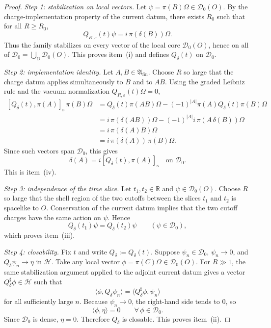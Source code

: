 \begin{proof}
\smallskip\noindent\textit{Step 1: stabilization on local vectors.}
Let \(\psi=\pi(B)\Omega\in\mathcal D_0(O)\). By the charge-implementation property of
the current datum, there exists \(R_0\) such that for all \(R\ge R_0\),
\[
Q_{R,\varepsilon}(t)\psi=i\,\pi(\delta(B))\Omega.
\]
Thus the family stabilizes on every vector of the local core \(\mathcal D_0(O)\), hence
on all of \(\mathcal D_0=\bigcup_O\mathcal D_0(O)\).
This proves item~\textnormal{(i)} and defines \(Q_\delta(t)\) on \(\mathcal D_0\).

\smallskip\noindent\textit{Step 2: implementation identity.}
Let \(A,B\in\mathfrak A_{\mathrm{fin}}\). Choose \(R\) so large that the charge datum
applies simultaneously to \(B\) and to \(AB\). Using the graded Leibniz rule and the
vacuum normalization \(Q_{R,\varepsilon}(t)\Omega=0\),
\[
\begin{aligned}
[Q_\delta(t),\pi(A)]_{\mathrm s}\,\pi(B)\Omega
&=
Q_\delta(t)\pi(AB)\Omega-(-1)^{|A|}\pi(A)Q_\delta(t)\pi(B)\Omega \\
&=
i\,\pi(\delta(AB))\Omega-(-1)^{|A|}i\,\pi(A\,\delta(B))\Omega \\
&=
i\,\pi(\delta(A)B)\Omega \\
&=
i\,\pi(\delta(A))\,\pi(B)\Omega.
\end{aligned}
\]
Since such vectors span \(\mathcal D_0\), this gives
\[
\delta(A)=i[Q_\delta(t),\pi(A)]_{\mathrm s}
\quad\text{on }\mathcal D_0.
\]
This is item~\textnormal{(iv)}.

\smallskip\noindent\textit{Step 3: independence of the time slice.}
Let \(t_1,t_2\in\mathbb R\) and \(\psi\in\mathcal D_0(O)\). Choose \(R\) so large that the
shell region of the two cutoffs between the slices \(t_1\) and \(t_2\) is spacelike to
\(O\). Conservation of the current datum implies that the two cutoff charges have the
same action on \(\psi\). Hence
\[
Q_\delta(t_1)\psi=Q_\delta(t_2)\psi
\qquad(\psi\in\mathcal D_0),
\]
which proves item~\textnormal{(iii)}.

\smallskip\noindent\textit{Step 4: closability.}
Fix \(t\) and write \(Q_\delta:=Q_\delta(t)\).
Suppose \(\psi_n\in\mathcal D_0\), \(\psi_n\to 0\), and \(Q_\delta\psi_n\to\eta\) in
\(\mathcal H\).
Take any local vector \(\phi=\pi(C)\Omega\in\mathcal D_0(O)\). For \(R\gg 1\), the same
stabilization argument applied to the adjoint current datum gives a vector
\(Q_\delta^\sharp\phi\in\mathcal H\) such that
\[
\langle \phi,Q_\delta\psi_n\rangle
=
\langle Q_\delta^\sharp\phi,\psi_n\rangle
\]
for all sufficiently large \(n\).
Because \(\psi_n\to 0\), the right-hand side tends to \(0\), so
\[
\langle \phi,\eta\rangle = 0
\qquad\forall\,\phi\in\mathcal D_0.
\]
Since \(\mathcal D_0\) is dense, \(\eta=0\). Therefore \(Q_\delta\) is closable.
This proves item~\textnormal{(ii)}.


\end{proof}
